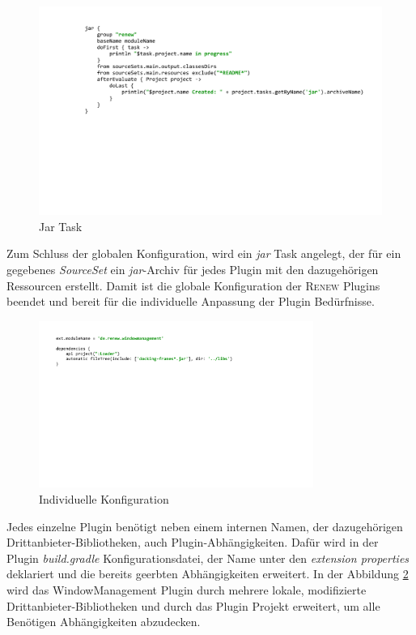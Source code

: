 	\begin{figure}[h!]
	  \centering
	  \includegraphics[width=\textwidth]{material/images/jar.pdf}
	  \caption{Jar Task}
	  \label{fig:jar}
	\end{figure}

	Zum Schluss der globalen Konfiguration, wird ein \textit{jar} Task angelegt, der für ein gegebenes \textit{SourceSet} ein \textit{jar}-Archiv für jedes Plugin mit den dazugehörigen Ressourcen erstellt.\newline
	Damit ist die globale Konfiguration der \textsc{Renew} Plugins beendet und bereit für die individuelle Anpassung der Plugin Bedürfnisse.\bigbreak

	\begin{figure}[h!]
	  \centering
	  \includegraphics[width=0.8\textwidth]{material/images/gradle/winmangradle.pdf}
	  \caption{Individuelle Konfiguration}
	  \label{fig:windmang}
	\end{figure}

	Jedes einzelne Plugin benötigt neben einem internen Namen, der dazugehörigen Drittanbieter-Bibliotheken, auch Plugin-Abhängigkeiten. Dafür wird in der Plugin \textit{build.gradle} Konfigurationsdatei, der Name unter den \textit{extension properties} deklariert und die bereits geerbten Abhängigkeiten erweitert. In der Abbildung \ref{fig:windmang} wird das WindowManagement Plugin durch mehrere lokale, modifizierte Drittanbieter-Bibliotheken und durch das Plugin Projekt erweitert, um alle Benötigen Abhängigkeiten abzudecken.\bigbreak

